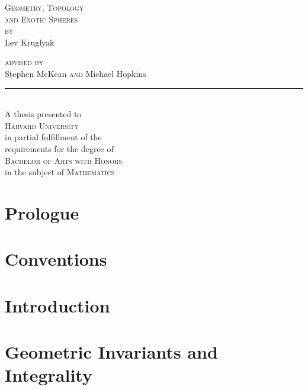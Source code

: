 \documentclass{lkx_thesis}
\begin{document}
\begin{titlepage}
	\begin{center}
		\vfill
		{\HUGE\scshape Geometry, Topology\\ and Exotic Spheres}\\[4em]

		{\Large \scshape by}\\[2em]
		{\huge Lev Kruglyak}\\[3in]

		{
		\Large
		{\scshape advised by\\[1em]}
		{Stephen McKean}
		{\scshape  and}
		{Michael Hopkins}\\[1em]
    \noindent\rule{1in}{0.6pt}\\[1em]
		A thesis presented to \\[1em]
		\textsc{Harvard University}\\[1em]
		in partial fulfillment of the \\
		requirements for the degree of\\[1em]

		\textsc{Bachelor of Arts with Honors}\\
		in the subject of \textsc{Mathematics}
		}
		\vfill
	\end{center}
\end{titlepage}

\lkxtoc

\chapter*{Prologue}\label{chap:prologue}


\chapter*{Conventions}\label{chap:conventions}


\chapter{Introduction}\label{chap:introduction}


\chapter{Geometric Invariants and Integrality}\label{chap:detection}

\end{document}
